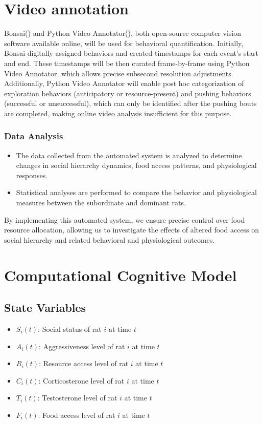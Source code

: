 \documentclass[english, a4paper, 11pt]{article}
\begin{document}
\section*{Video annotation}
Bonsai(\cite{lopesBonsaiEventbasedFramework2015}) and Python Video Annotator(\cite{ribeiroPythonvideoannotator}), both open-source computer vision software available online, will be used for behavioral quantification. Initially, Bonsai digitally assigned behaviors and created timestamps for each event's start and end. These timestamps will be then curated frame-by-frame using Python Video Annotator, which allows precise subsecond resolution adjustments. Additionally, Python Video Annotator will enable post hoc categorization of exploration behaviors (anticipatory or resource-present) and pushing behaviors (successful or unsuccessful), which can only be identified after the pushing bouts are completed, making online video analysis insufficient for this purpose.
\subsubsection*{Data Analysis}
\begin{itemize}
    \item The data collected from the automated system is analyzed to determine changes in social hierarchy dynamics, food access patterns, and physiological responses.
    \item Statistical analyses are performed to compare the behavior and physiological measures between the subordinate and dominant rats.
\end{itemize}

By implementing this automated system, we ensure precise control over food resource allocation, allowing us to investigate the effects of altered food access on social hierarchy and related behavioral and physiological outcomes.



\section*{Computational Cognitive Model}
\subsection*{State Variables}
\begin{itemize}
    \item \( S_i(t) \): Social status of rat \( i \) at time \( t \)
    \item \( A_i(t) \): Aggressiveness level of rat \( i \) at time \( t \)
    \item \( R_i(t) \): Resource access level of rat \( i \) at time \( t \)
    \item \( C_i(t) \): Corticosterone level of rat \( i \) at time \( t \)
    \item \( T_i(t) \): Testosterone level of rat \( i \) at time \( t \)
    \item \( F_i(t) \): Food access level of rat \( i \) at time \( t \)
\end{itemize}
\end{document}
